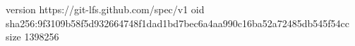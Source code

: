 version https://git-lfs.github.com/spec/v1
oid sha256:9f3109b58f5d932664748f1dad1bd7bec6a4aa990c16ba52a72485db545f54cc
size 1398256
